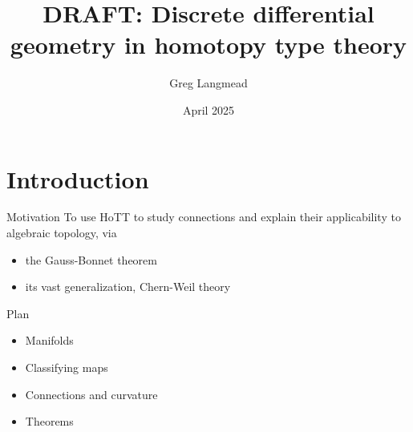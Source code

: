\documentclass[14pt,aspectratio=169]{beamer}
\title[Geometry in HoTT]{DRAFT: Discrete differential geometry in homotopy type theory}
\author{Greg Langmead}
\institute[CMU]{Carnegie Mellon University}
\date{April 2025}
\begin{document}
\begin{frame}
\titlepage
\end{frame}


\section{Introduction}

\begin{frame}{Motivation}
To use HoTT to study \alert{connections} and \alert{explain} their applicability to algebraic topology, via
\begin{itemize}
\item the Gauss-Bonnet theorem
\item its vast generalization, Chern-Weil theory
\end{itemize}
\end{frame}


\begin{frame}{Plan}
\begin{itemize}
\item Manifolds
\item Classifying maps
\item Connections and curvature
\item Theorems
\end{itemize}
\end{frame}
\end{document}
